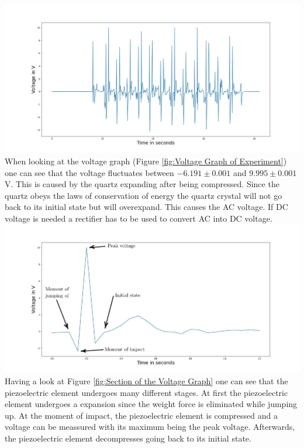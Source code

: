\includegraphics[width=\textwidth]{Figure_11.jpeg}
\label{fig:Voltage Graph of Experiment}
\vspace{0.5cm}
When looking at the voltage graph (Figure \ref{fig:Voltage Graph of Experiment}) one can see that the voltage fluctuates between $-6.191 \pm 0.001$ and $9.995 \pm 0.001$ V. This is caused by the quartz expanding after being compressed. Since the quartz obeys the laws of conservation of energy the quartz crystal will not go back to its initial state but will overexpand. This causes the AC voltage. If DC voltage is needed a rectifier has to be used to convert AC into DC voltage.
\includegraphics[width=\textwidth]{Figure_12.jpg}
\label{fig:Section of the Voltage Graph}
\vspace{0.5cm}
Having a look at Figure \ref{fig:Section of the Voltage Graph} one can see that the piezoelectric element undergoes many different stages. At first the piezoelectric element undergoes a expansion since the weight force is eliminated while jumping up. At the moment of impact, the piezoelectric element is compressed and a voltage can be meassured with its maximum being the peak voltage. Afterwards, the piezoelectric element decompresses going back to its initial state.